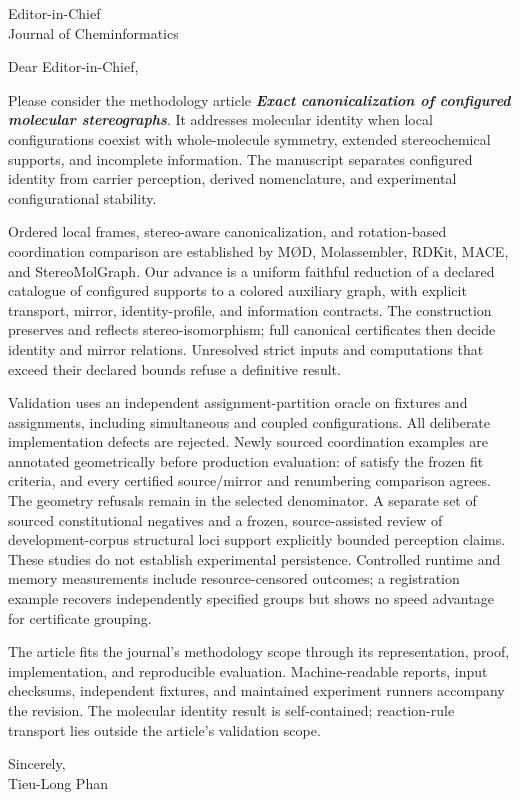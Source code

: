 \documentclass[11pt,a4paper]{letter}
\begin{document}
\begin{letter}{Editor-in-Chief\\Journal of Cheminformatics}
\opening{Dear Editor-in-Chief,}

Please consider the methodology article
\textbf{\textit{Exact canonicalization of configured molecular stereographs}}.
It addresses molecular identity when local configurations coexist with
whole-molecule symmetry, extended stereochemical supports, and incomplete
information. The manuscript separates configured identity from carrier
perception, derived nomenclature, and experimental configurational stability.

Ordered local frames, stereo-aware canonicalization, and rotation-based
coordination comparison are established by M\O D, Molassembler, RDKit, MACE,
and StereoMolGraph. Our advance is a uniform faithful reduction of a declared
catalogue of configured supports to a colored auxiliary graph, with explicit
transport, mirror, identity-profile, and information contracts. The
construction preserves and reflects stereo-isomorphism; full canonical
certificates then decide identity and mirror relations. Unresolved strict
inputs and computations that exceed their declared bounds refuse a
definitive result.

Validation uses an independent assignment-partition oracle on \IndependentCases{} fixtures
and \IndependentAssignments{} assignments, including simultaneous and coupled configurations.
All \MutationsRejected{} deliberate implementation defects are rejected. Newly sourced
coordination examples are annotated geometrically before production
evaluation: \ChemicalCoordinationCertified{} of \ChemicalCoordinationSelected{} satisfy the frozen fit criteria, and every certified
source/mirror and renumbering comparison agrees. The \ChemicalCoordinationUnresolved{} geometry refusals remain
in the selected denominator. A separate set of \ChemicalNegativeSelected{} sourced constitutional
negatives and a frozen, source-assisted review of \ChemicalRotASelected{} development-corpus
structural loci support explicitly bounded perception claims. These studies
do not establish experimental persistence. Controlled runtime and memory
measurements include resource-censored outcomes; a registration example
recovers independently specified groups but shows no speed advantage for
certificate grouping.

The article fits the journal's methodology scope through its representation,
proof, implementation, and reproducible evaluation. Machine-readable reports,
input checksums, independent fixtures, and maintained experiment runners
accompany the revision. The molecular identity result is self-contained;
reaction-rule transport lies outside the article's validation scope.

\closing{Sincerely,\\Tieu-Long Phan}
\end{letter}
\end{document}

